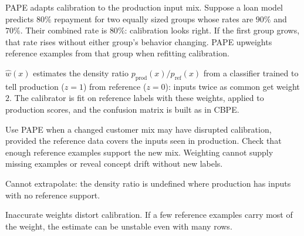 PAPE adapts calibration to the production input mix. Suppose a loan model predicts $80\%$ repayment for two equally sized groups whose rates are $90\%$ and $70\%$. Their combined rate is $80\%$: calibration looks right. If the first group grows, that rate rises without either group's behavior changing. PAPE upweights reference examples from that group when refitting calibration.

\begin{metricformula}
\end{metricformula}

$\hat{w}(x)$ estimates the density ratio $p_{\text{prod}}(x)/p_{\text{ref}}(x)$ from a classifier trained to tell production
($z=1$) from reference ($z=0$): inputs twice as common get weight $2$. The calibrator is fit on reference labels with these weights,
applied to production scores, and the confusion matrix is built as in CBPE.


Use PAPE when a changed customer mix may have disrupted calibration, provided the reference data covers the inputs seen in
production. Check that enough reference examples support the new mix. Weighting cannot supply missing examples or reveal
concept drift without new labels.


{
\item Cannot extrapolate: the density ratio is undefined where production has inputs with no reference support.
\item Inaccurate weights distort calibration. If a few reference examples carry most of the weight, the estimate can be unstable even with many rows.
}

